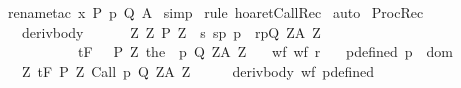 \begin{isabellebody}
\ {\isacharparenleft}rename{\isacharunderscore}tac\ x\ P\ p\ Q\ A{\isacharparenright}\isanewline
{}\isamarkupfalse%
\ simp\isanewline
{}\isamarkupfalse%
\ {\isacharparenleft}rule\ hoaret{\isachardot}CallRec{\isacharparenright}\isanewline
{}\isamarkupfalse%
\ auto\isanewline
{}\isamarkupfalse%
%
\endisatagproof
{\isafoldproof}%
%
\isadelimproof
\isanewline
%
\endisadelimproof
\isanewline
{}\isamarkupfalse%
\ ProcRec{}{\isacharcolon}\isanewline
\ \ \ deriv{\isacharunderscore}body{\isacharcolon}\ \ \isanewline
\ \ \ {\isachardoublequoteopen}{\isasymforall}{\isasymsigma}\ Z{\isachardot}\ {\isasymGamma}{\isacharcomma}{\isasymTheta}{\isasymunion}{\isacharparenleft}{\isasymUnion}Z{\isachardot}\ {\isacharbraceleft}{\isacharparenleft}P\ Z\ {\isasyminter}\ {\isacharbraceleft}s{\isachardot}\ {\isacharparenleft}{\isacharparenleft}s{\isacharcomma}p{\isacharparenright}{\isacharcomma}\ {\isasymsigma}{\isacharcomma}p{\isacharparenright}\ {\isasymin}\ r{\isacharbraceright}{\isacharcomma}p{\isacharcomma}Q\ Z{\isacharcomma}A\ Z{\isacharparenright}{\isacharbraceright}{\isacharparenright}\isanewline
\ \ \ \ \ \ \ \ \ \ \ {\isasymturnstile}\isactrlsub t\isactrlbsub {\isacharslash}F\isactrlesub \ {\isacharparenleft}{\isacharbraceleft}{\isasymsigma}{\isacharbraceright}\ {\isasyminter}\ P\ Z{\isacharparenright}\ {\isacharparenleft}the\ {\isacharparenleft}{\isasymGamma}\ p{\isacharparenright}{\isacharparenright}\ {\isacharparenleft}Q\ Z{\isacharparenright}{\isacharcomma}{\isacharparenleft}A\ Z{\isacharparenright}{\isachardoublequoteclose}\isanewline
\ \ \ wf{\isacharcolon}\ {\isachardoublequoteopen}wf\ r{\isachardoublequoteclose}\isanewline
\ \ \ p{\isacharunderscore}defined{\isacharcolon}\ {\isachardoublequoteopen}p\ {\isasymin}\ dom\ {\isasymGamma}{\isachardoublequoteclose}\isanewline
\ \ \ {\isachardoublequoteopen}{\isasymforall}Z{\isachardot}\ {\isasymGamma}{\isacharcomma}{\isasymTheta}{\isasymturnstile}\isactrlsub t\isactrlbsub {\isacharslash}F\isactrlesub \ {\isacharparenleft}P\ Z{\isacharparenright}\ Call\ p\ {\isacharparenleft}Q\ Z{\isacharparenright}{\isacharcomma}{\isacharparenleft}A\ Z{\isacharparenright}{\isachardoublequoteclose}\isanewline
%
\isadelimproof
%
\endisadelimproof
%
\isatagproof
{}\isamarkupfalse%
\ {\isacharminus}\isanewline
\ \ \isamarkupfalse%
\ deriv{\isacharunderscore}body\ wf\ p{\isacharunderscore}defined\isanewline
\ \ \isamarkupfalse%

\end{isabellebody}
